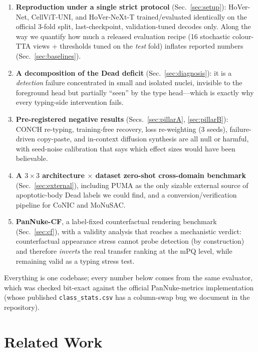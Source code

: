 \documentclass[11pt]{article}
\begin{document}
\begin{enumerate}
\item \textbf{Reproduction under a single strict protocol} (Sec.~\ref{sec:setup}): HoVer-Net,
CellViT-UNI, and HoVer-NeXt-T trained/evaluated identically on the official 3-fold split,
last-checkpoint, validation-tuned decodes only. Along the way we quantify how much a released
evaluation recipe (16 stochastic colour-TTA views + thresholds tuned on the \emph{test} fold)
inflates reported numbers (Sec.~\ref{sec:baselines}).
\item \textbf{A decomposition of the Dead deficit} (Sec.~\ref{sec:diagnosis}): it is a
\emph{detection} failure concentrated in small and isolated nuclei, invisible to the foreground
head but partially ``seen'' by the type head---which is exactly why every typing-side
intervention fails.
\item \textbf{Pre-registered negative results} (Secs.~\ref{sec:pillarA}, \ref{sec:pillarB}):
CONCH re-typing, training-free recovery, loss re-weighting (3 seeds), failure-driven
copy-paste, and in-context diffusion synthesis are all null or harmful, with seed-noise
calibration that says which effect sizes would have been believable.
\item \textbf{A $3{\times}3$ architecture $\times$ dataset zero-shot cross-domain benchmark}
(Sec.~\ref{sec:external}), including PUMA as the only sizable external source of apoptotic-body
Dead labels we could find, and a conversion/verification pipeline for CoNIC and MoNuSAC.
\item \textbf{PanNuke-CF}, a label-fixed counterfactual rendering benchmark
(Sec.~\ref{sec:cf}), with a validity analysis that reaches a mechanistic verdict: counterfactual
appearance stress cannot probe detection (by construction) and therefore \emph{inverts} the
real transfer ranking at the mPQ level, while remaining valid as a typing stress test.
\end{enumerate}

Everything is one codebase; every number below comes from the same evaluator, which was checked
bit-exact against the official PanNuke-metrics implementation (whose published
\texttt{class\_stats.csv} has a column-swap bug we document in the repository).

\section{Related Work}
\label{sec:related}
\end{document}
